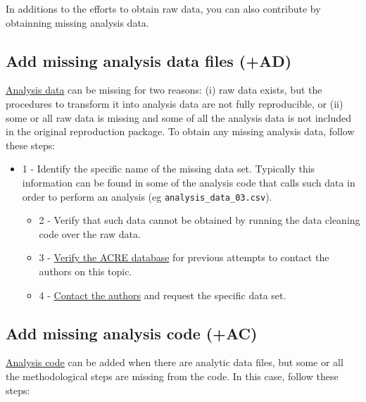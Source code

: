 \documentclass[]{book}
\providecommand{\tightlist}{%
  \setlength{\itemsep}{0pt}\setlength{\parskip}{0pt}}
\begin{document}
In additions to the efforts to obtain raw data, you can also contribute by obtainning missing analysis data.

\hypertarget{ad}{%
\subsection{Add missing analysis data files (+AD)}\label{ad}}

\protect\hyperlink{describe-inputs}{Analysis data} can be missing for two reasons: (i) raw data exists, but the procedures to transform it into analysis data are not fully reproducible, or (ii) some or all raw data is missing and some of all the analysis data is not included in the original reproduction package. To obtain any missing analysis data, follow these steps:

\begin{itemize}
\tightlist
\item
  1 - Identify the specific name of the missing data set. Typically this information can be found in some of the analysis code that calls such data in order to perform an analysis (eg \texttt{analysis\_data\_03.csv}).

  \begin{itemize}
  \tightlist
  \item
    2 - Verify that such data cannot be obtained by running the data cleaning code over the raw data.\\
  \item
    3 - \href{ADD\%20LINK}{Verify the ACRE database} for previous attempts to contact the authors on this topic.\\
  \item
    4 - \protect\hyperlink{tips-for-communication}{Contact the authors} and request the specific data set.
  \end{itemize}
\end{itemize}

\hypertarget{ac}{%
\subsection{Add missing analysis code (+AC)}\label{ac}}

\protect\hyperlink{describe-inputs}{Analysis code} can be added when there are analytic data files, but some or all the methodological steps are missing from the code. In this case, follow these steps:
\end{document}
